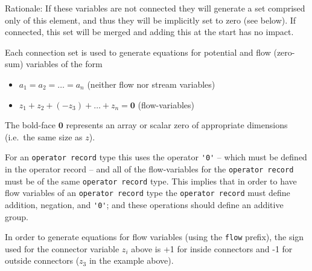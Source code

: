 \begin{nonnormative}
Rationale: If these variables are not connected they will
generate a set comprised only of this element, and thus they will be
implicitly set to zero (see below). If connected, this set will be
merged and adding this at the start has no impact.
\end{nonnormative}

Each connection set is used to generate equations for potential and flow
(zero-sum) variables of the form
\begin{itemize}
\item
$a_{1} = a_{2} = \ldots = a_{n}$ (neither flow nor stream variables)
\item
$z_{1} + z_{2} + (-z_{3}) + \ldots + z_{n} = \mathbf{0}$ (flow-variables)
\end{itemize}

The bold-face $\mathbf{0}$ represents an array or scalar zero of
appropriate dimensions (i.e.\ the same size as $z$).

For an \lstinline!operator record! type this uses the operator \lstinline!'0'! -- which must be defined in the operator record -- and all of the flow-variables for the \lstinline!operator record!
must be of the same \lstinline!operator record! type.  This implies that in order to have flow variables of an \lstinline!operator record! type the \lstinline!operator record! must define addition,
negation, and \lstinline!'0'!; and these operations should define an additive group.

In order to generate equations for flow variables (using the
\lstinline!flow! prefix), the sign used for the connector variable
$z_{i}$ above is +1 for inside connectors and -1 for outside
connectors ($z_{3}$ in the example above).

